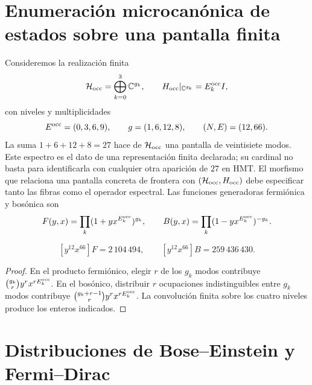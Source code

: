 \section{Enumeración microcanónica de estados sobre una pantalla finita}
\label{v:rec:ocupacion:section:01}

Consideremos la realización finita
\[
 \mathcal H_{\rm occ}=\bigoplus_{k=0}^{3}\mathbb C^{g_k},
 \qquad
 H_{\rm occ}|_{\mathbb C^{g_k}}=E_k^{\rm occ} I,
\]
con niveles y multiplicidades
\[
 E^{\rm occ}=(0,3,6,9),\qquad g=(1,6,12,8),
 \qquad(N,E)=(12,66).
\]
La suma \(1+6+12+8=27\) hace de \(\mathcal H_{\rm occ}\) una pantalla de
veintisiete modos. Este espectro es el dato de una representación finita
declarada; su cardinal no basta para identificarla con cualquier otra
aparición de \(27\) en HMT\@. El morfismo que relaciona una pantalla concreta
de frontera con \((\mathcal H_{\rm occ},H_{\rm occ})\) debe especificar tanto
las fibras como el operador espectral.
Las funciones generadoras fermiónica y bosónica son
\[
 F(y,x)=\prod_k(1+yx^{E_k^{\rm occ}})^{g_k},
 \qquad
 B(y,x)=\prod_k(1-yx^{E_k^{\rm occ}})^{-g_k}.
\]

\begin{proposition}
\label{v:rec:prop:cardinalidades-microcanonicas}
\[
 [y^{12}x^{66}]F=2\,104\,494,
 \qquad
 [y^{12}x^{66}]B=259\,436\,430.
\]
\end{proposition}
\begin{proof}
En el producto fermiónico, elegir \(r\) de los \(g_k\) modos contribuye
\(\binom{g_k}{r}y^rx^{rE_k^{\rm occ}}\). En el bosónico, distribuir \(r\)
ocupaciones indistinguibles entre \(g_k\) modos contribuye
\(\binom{g_k+r-1}{r}y^rx^{rE_k^{\rm occ}}\). La convolución finita sobre los
cuatro niveles produce los enteros indicados.
\end{proof}

\section{Distribuciones de Bose--Einstein y Fermi--Dirac}
\begingroup\fontsize{10}{11.5}\selectfont\setlength{\parskip}{1.5pt}
\setlength{\abovedisplayskip}{3pt}\setlength{\belowdisplayskip}{3pt}
\setlength{\abovedisplayshortskip}{2pt}\setlength{\belowdisplayshortskip}{2pt}
\label{v:rec:ocupacion:section:02}

